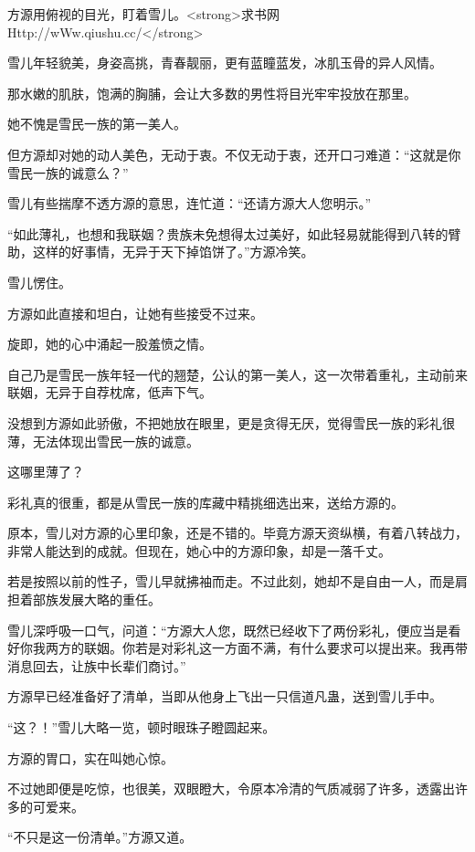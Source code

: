 
\begin{this_body}

方源用俯视的目光，盯着雪儿。<strong>求书网Http://wWw.qiushu.cc/</strong>

雪儿年轻貌美，身姿高挑，青春靓丽，更有蓝瞳蓝发，冰肌玉骨的异人风情。

那水嫩的肌肤，饱满的胸脯，会让大多数的男性将目光牢牢投放在那里。

她不愧是雪民一族的第一美人。

但方源却对她的动人美色，无动于衷。不仅无动于衷，还开口刁难道：“这就是你雪民一族的诚意么？”

雪儿有些揣摩不透方源的意思，连忙道：“还请方源大人您明示。”

“如此薄礼，也想和我联姻？贵族未免想得太过美好，如此轻易就能得到八转的臂助，这样的好事情，无异于天下掉馅饼了。”方源冷笑。

雪儿愣住。

方源如此直接和坦白，让她有些接受不过来。

旋即，她的心中涌起一股羞愤之情。

自己乃是雪民一族年轻一代的翘楚，公认的第一美人，这一次带着重礼，主动前来联姻，无异于自荐枕席，低声下气。

没想到方源如此骄傲，不把她放在眼里，更是贪得无厌，觉得雪民一族的彩礼很薄，无法体现出雪民一族的诚意。

这哪里薄了？

彩礼真的很重，都是从雪民一族的库藏中精挑细选出来，送给方源的。

原本，雪儿对方源的心里印象，还是不错的。毕竟方源天资纵横，有着八转战力，非常人能达到的成就。但现在，她心中的方源印象，却是一落千丈。

若是按照以前的性子，雪儿早就拂袖而走。不过此刻，她却不是自由一人，而是肩担着部族发展大略的重任。

雪儿深呼吸一口气，问道：“方源大人您，既然已经收下了两份彩礼，便应当是看好你我两方的联姻。你若是对彩礼这一方面不满，有什么要求可以提出来。我再带消息回去，让族中长辈们商讨。”

方源早已经准备好了清单，当即从他身上飞出一只信道凡蛊，送到雪儿手中。

“这？！”雪儿大略一览，顿时眼珠子瞪圆起来。

方源的胃口，实在叫她心惊。

不过她即便是吃惊，也很美，双眼瞪大，令原本冷清的气质减弱了许多，透露出许多的可爱来。

“不只是这一份清单。”方源又道。


\end{this_body}
